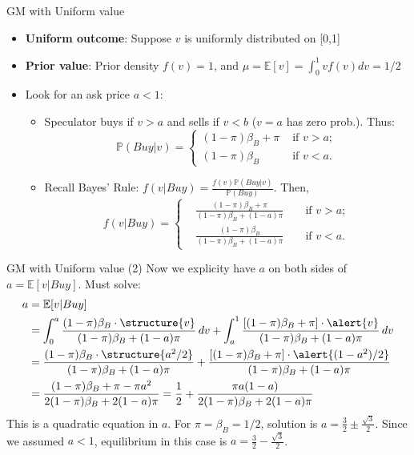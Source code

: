 \documentclass[english,10pt
,aspectratio=169
]{beamer}
\begin{document}
\begin{frame}{GM with Uniform value}
	\begin{itemize}
		\item \textbf{Uniform outcome}: Suppose $v$ is uniformly distributed on [0,1]
		\item \textbf{Prior value}: Prior density $f(v) = 1$, and $\mu = \mathbb{E}[v] = \int_0^1 v f(v) dv= 1/2$
		\item Look for an ask price $a < 1$:
		\begin{itemize}
			\item Speculator buys if  $v>a$ and sells if $v<b$ ($v=a$ has zero prob.). Thus:
			\begin{equation*}
			\mathbb{P}(Buy|v) = 
			\left\{
			\begin{aligned}
			(1-\pi) \beta_B + \pi 	&\text{ if } v > a; \\
			(1-\pi) \beta_B 		&\text{ if } v<a.
			\end{aligned}
			\right.
			\end{equation*}
			\item Recall Bayes' Rule: $f(v|  Buy) = \frac{f(v) \mathbb{P}(Buy| v)} {\mathbb{P}(Buy)}$. Then,
			\begin{equation*}
			f(v|  Buy)=\left\{
			\begin{aligned}
			&\frac{(1-\pi)\beta_B + \pi} {(1-\pi)\beta_B + (1-a)\pi}	&& \text{ if } v>a; \\
			&\frac{(1-\pi)\beta_B} {(1-\pi)\beta_B + (1-a)\pi}		&& \text{ if } v<a.
			\end{aligned}
			\right.
			\end{equation*}
		\end{itemize}
	\end{itemize}
\end{frame}


\begin{frame}{GM with Uniform value (2)}
	Now we explicity have $a$ on both sides of $a=\mathbb{E}[v|Buy]$. Must solve:
	\begin{align*}
	a 
	& = \mathbb{E}[v|Buy] \\
	& = \int^{a}_0 \frac{(1-\pi) \beta_B \cdot \structure{v}}{(1-\pi)\beta_B + (1-a) \pi} \, dv + \int^{1}_{a} \frac{[(1-\pi) \beta_B + \pi] \cdot \alert{v}}{(1-\pi)\beta_B + (1-a) \pi} \, dv \\
	& =  \frac{(1-\pi) \beta_B \cdot \structure{a^2/2}}{(1-\pi)\beta_B + (1-a) \pi}+  \frac{[(1-\pi) \beta_B + \pi] \cdot \alert{(1-a^2)/2}}{(1-\pi)\beta_B + (1-a) \pi} \\
	& =  \frac{(1-\pi) \beta_B + \pi -\pi a^2}{2(1-\pi)\beta_B + 2(1-a) \pi} = \frac{1}{2} + \frac{\pi a (1 - a)}{2(1-\pi)\beta_B + 2(1-a) \pi}
	\end{align*}
	This is a quadratic equation in $a$. For $\pi=\beta_B=1/2$, solution is $a=\frac{3}{2} \pm \frac{\sqrt{3}}{2}$. Since we assumed $a<1$, equilibrium in this case  is $a=\frac{3}{2} - \frac{\sqrt{3}}{2}$.
\end{frame}
\end{document}
